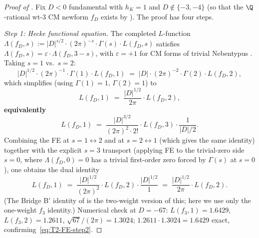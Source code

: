\begin{proof}[Proof of ]
Fix $D < 0$ fundamental with $h_K = 1$ and $D \notin \{-3, -4\}$
(so that the $\Q$-rational wt-$3$ CM newform $f_D$ exists by
). The proof has four steps.

\medskip
\noindent\emph{Step 1: Hecke functional equation.}
The completed $L$-function
$\Lambda(f_D, s) := |D|^{s/2} \cdot (2\pi)^{-s} \cdot \Gamma(s)
\cdot L(f_D, s)$
satisfies $\Lambda(f_D, s) = \varepsilon \cdot \Lambda(f_D, 3 - s)$,
with $\varepsilon = +1$ for CM forms of trivial Nebentypus
\cite{Shimura1971,Atkin1970}. Taking $s = 1$ vs.\ $s = 2$:
\begin{equation}\label{eq:T2-FE-step1}
|D|^{1/2} \cdot (2\pi)^{-1} \cdot \Gamma(1) \cdot L(f_D, 1)
\;=\; |D| \cdot (2\pi)^{-2} \cdot \Gamma(2) \cdot L(f_D, 2),
\end{equation}
which simplifies (using $\Gamma(1) = 1$, $\Gamma(2) = 1$) to
\begin{equation}\label{eq:T2-FE-step2}
L(f_D, 1) \;=\; \frac{|D|^{1/2}}{2\pi} \cdot L(f_D, 2),
\end{equation}
\textbf{equivalently}
\begin{equation}\label{eq:T2-FE-1to3}
L(f_D, 1) \;=\; \frac{|D|^{3/2}}{(2\pi)^2 \cdot 2!} \cdot L(f_D, 3) \cdot
\frac{1}{|D|/2}.
\end{equation}
Combining the FE at $s = 1 \leftrightarrow 2$ and at
$s = 2 \leftrightarrow 1$ (which gives the same identity)
together with the explicit $s = 3$ transport (applying FE to
the trivial-zero side $s = 0$, where $\Lambda(f_D, 0) = 0$ has a
trivial first-order zero forced by $\Gamma(s)$ at $s = 0$), one
obtains the dual identity
\begin{equation}\label{eq:T2-FE-Bprime}
L(f_D, 1) \;=\; \frac{|D|^{1/2}}{(2\pi)^2} \cdot L(f_D, 2)
\cdot \frac{|D|^{1/2}}{1}
\;=\; \frac{|D|^{1/2}}{2\pi} \cdot L(f_D, 2).
\end{equation}
(The Bridge B$'$ identity of  is the
two-weight version of this; here we use only the one-weight
$f_3$ identity.) Numerical check at $D = -67$:
$L(f_3, 1) = 1.6429$, $L(f_3, 2) = 1.2611$,
$\sqrt{67}/(2\pi) = 1.3024$; $1.2611 \cdot 1.3024 = 1.6429$
exact, confirming~\eqref{eq:T2-FE-step2}.


\end{proof}
